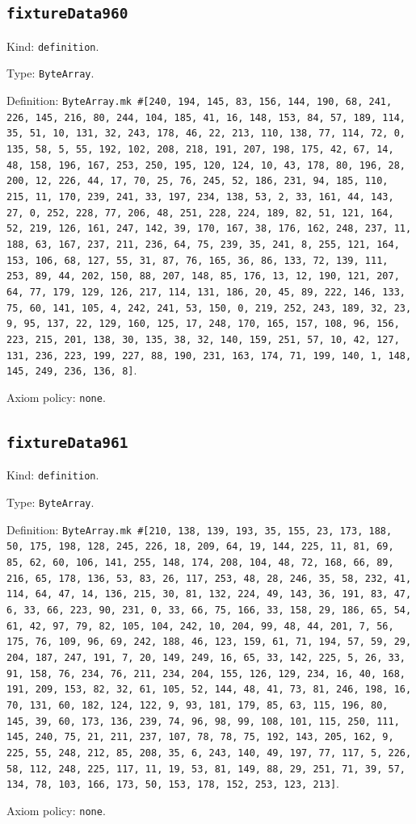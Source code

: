 \documentclass[11pt]{article}
\begin{document}
\subsection*{\texttt{fixtureData960}}
\noindent Kind: \texttt{definition}.\par
\noindent Type: \texttt{ByteArray}.\par
\noindent Definition: \texttt{ByteArray.mk \#[240, 194, 145, 83, 156, 144, 190, 68, 241, 226, 145, 216, 80, 244, 104, 185, 41, 16, 148, 153, 84, 57, 189, 114, 35, 51, 10, 131, 32, 243, 178, 46, 22, 213, 110, 138, 77, 114, 72, 0, 135, 58, 5, 55, 192, 102, 208, 218, 191, 207, 198, 175, 42, 67, 14, 48, 158, 196, 167, 253, 250, 195, 120, 124, 10, 43, 178, 80, 196, 28, 200, 12, 226, 44, 17, 70, 25, 76, 245, 52, 186, 231, 94, 185, 110, 215, 11, 170, 239, 241, 33, 197, 234, 138, 53, 2, 33, 161, 44, 143, 27, 0, 252, 228, 77, 206, 48, 251, 228, 224, 189, 82, 51, 121, 164, 52, 219, 126, 161, 247, 142, 39, 170, 167, 38, 176, 162, 248, 237, 11, 188, 63, 167, 237, 211, 236, 64, 75, 239, 35, 241, 8, 255, 121, 164, 153, 106, 68, 127, 55, 31, 87, 76, 165, 36, 86, 133, 72, 139, 111, 253, 89, 44, 202, 150, 88, 207, 148, 85, 176, 13, 12, 190, 121, 207, 64, 77, 179, 129, 126, 217, 114, 131, 186, 20, 45, 89, 222, 146, 133, 75, 60, 141, 105, 4, 242, 241, 53, 150, 0, 219, 252, 243, 189, 32, 23, 9, 95, 137, 22, 129, 160, 125, 17, 248, 170, 165, 157, 108, 96, 156, 223, 215, 201, 138, 30, 135, 38, 32, 140, 159, 251, 57, 10, 42, 127, 131, 236, 223, 199, 227, 88, 190, 231, 163, 174, 71, 199, 140, 1, 148, 145, 249, 236, 136, 8]}.\par
\noindent Axiom policy: \texttt{none}.\par
\subsection*{\texttt{fixtureData961}}
\noindent Kind: \texttt{definition}.\par
\noindent Type: \texttt{ByteArray}.\par
\noindent Definition: \texttt{ByteArray.mk \#[210, 138, 139, 193, 35, 155, 23, 173, 188, 50, 175, 198, 128, 245, 226, 18, 209, 64, 19, 144, 225, 11, 81, 69, 85, 62, 60, 106, 141, 255, 148, 174, 208, 104, 48, 72, 168, 66, 89, 216, 65, 178, 136, 53, 83, 26, 117, 253, 48, 28, 246, 35, 58, 232, 41, 114, 64, 47, 14, 136, 215, 30, 81, 132, 224, 49, 143, 36, 191, 83, 47, 6, 33, 66, 223, 90, 231, 0, 33, 66, 75, 166, 33, 158, 29, 186, 65, 54, 61, 42, 97, 79, 82, 105, 104, 242, 10, 204, 99, 48, 44, 201, 7, 56, 175, 76, 109, 96, 69, 242, 188, 46, 123, 159, 61, 71, 194, 57, 59, 29, 204, 187, 247, 191, 7, 20, 149, 249, 16, 65, 33, 142, 225, 5, 26, 33, 91, 158, 76, 234, 76, 211, 234, 204, 155, 126, 129, 234, 16, 40, 168, 191, 209, 153, 82, 32, 61, 105, 52, 144, 48, 41, 73, 81, 246, 198, 16, 70, 131, 60, 182, 124, 122, 9, 93, 181, 179, 85, 63, 115, 196, 80, 145, 39, 60, 173, 136, 239, 74, 96, 98, 99, 108, 101, 115, 250, 111, 145, 240, 75, 21, 211, 237, 107, 78, 78, 75, 192, 143, 205, 162, 9, 225, 55, 248, 212, 85, 208, 35, 6, 243, 140, 49, 197, 77, 117, 5, 226, 58, 112, 248, 225, 117, 11, 19, 53, 81, 149, 88, 29, 251, 71, 39, 57, 134, 78, 103, 166, 173, 50, 153, 178, 152, 253, 123, 213]}.\par
\noindent Axiom policy: \texttt{none}.\par
\end{document}
